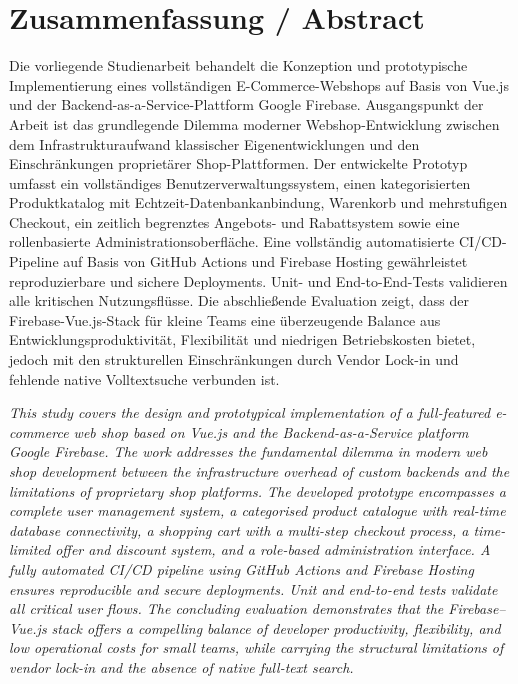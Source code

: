 
\chapter*{Zusammenfassung / Abstract}

Die vorliegende Studienarbeit behandelt die Konzeption und prototypische Implementierung eines vollständigen E-Commerce-Webshops auf Basis von Vue.js und der Backend-as-a-Service-Plattform Google Firebase. Ausgangspunkt der Arbeit ist das grundlegende Dilemma moderner Webshop-Entwicklung zwischen dem Infrastrukturaufwand klassischer Eigenentwicklungen und den Einschränkungen proprietärer Shop-Plattformen. Der entwickelte Prototyp umfasst ein vollständiges Benutzerverwaltungssystem, einen kategorisierten Produktkatalog mit Echtzeit-Datenbankanbindung, Warenkorb und mehrstufigen Checkout, ein zeitlich begrenztes Angebots- und Rabattsystem sowie eine rollenbasierte Administrationsoberfläche. Eine vollständig automatisierte CI/CD-Pipeline auf Basis von GitHub Actions und Firebase Hosting gewährleistet reproduzierbare und sichere Deployments. Unit- und End-to-End-Tests validieren alle kritischen Nutzungsflüsse. Die abschließende Evaluation zeigt, dass der Firebase-Vue.js-Stack für kleine Teams eine überzeugende Balance aus Entwicklungsproduktivität, Flexibilität und niedrigen Betriebskosten bietet, jedoch mit den strukturellen Einschränkungen durch Vendor Lock-in und fehlende native Volltextsuche verbunden ist.

\vspace{1em}

\textit{This study covers the design and prototypical implementation of a full-featured e-commerce web shop based on Vue.js and the Backend-as-a-Service platform Google Firebase. The work addresses the fundamental dilemma in modern web shop development between the infrastructure overhead of custom backends and the limitations of proprietary shop platforms. The developed prototype encompasses a complete user management system, a categorised product catalogue with real-time database connectivity, a shopping cart with a multi-step checkout process, a time-limited offer and discount system, and a role-based administration interface. A fully automated CI/CD pipeline using GitHub Actions and Firebase Hosting ensures reproducible and secure deployments. Unit and end-to-end tests validate all critical user flows. The concluding evaluation demonstrates that the Firebase--Vue.js stack offers a compelling balance of developer productivity, flexibility, and low operational costs for small teams, while carrying the structural limitations of vendor lock-in and the absence of native full-text search.}
